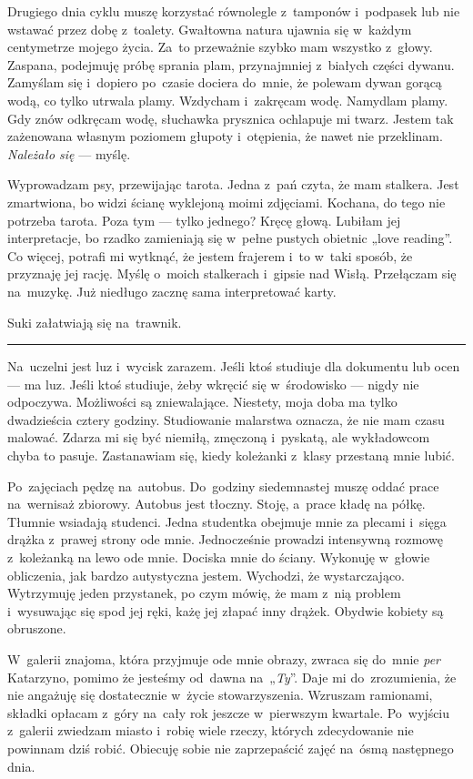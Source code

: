 \documentclass[9pt, a5paper]{memoir}
\begin{document}
Drugiego dnia cyklu muszę korzystać równolegle z~tamponów i~podpasek lub nie wstawać przez dobę z~toalety. Gwałtowna natura ujawnia się w~każdym centymetrze mojego życia. Za~to przeważnie szybko mam wszystko z~głowy. Zaspana, podejmuję próbę sprania plam, przynajmniej z~białych części dywanu. Zamyślam się i~dopiero po~czasie dociera do~mnie, że polewam dywan gorącą wodą, co tylko utrwala plamy. Wzdycham i~zakręcam wodę. Namydlam plamy. Gdy znów odkręcam wodę, słuchawka prysznica ochlapuje mi twarz. Jestem tak zażenowana własnym poziomem głupoty i~otępienia, że nawet nie przeklinam. \textit{Należało się} --- myślę.

Wyprowadzam psy, przewijając tarota. Jedna z~pań czyta, że mam stalkera. Jest zmartwiona, bo widzi ścianę wyklejoną moimi zdjęciami. Kochana, do tego nie potrzeba tarota. Poza tym --- tylko jednego? Kręcę głową. Lubiłam jej interpretacje, bo rzadko zamieniają się w~pełne pustych obietnic „love reading”. Co więcej, potrafi mi wytknąć, że jestem frajerem i~to w~taki sposób, że przyznaję jej rację. Myślę o~moich stalkerach i~gipsie nad Wisłą. Przełączam się na~muzykę. Już niedługo zacznę sama interpretować karty.

Suki załatwiają się na~trawnik.

\fancybreak{* \quad * \quad *}

Na~uczelni jest luz i~wycisk zarazem. Jeśli ktoś studiuje dla dokumentu lub ocen --- ma luz. Jeśli ktoś studiuje, żeby wkręcić się w~środowisko --- nigdy nie odpoczywa. Możliwości są zniewalające. Niestety, moja doba ma tylko dwadzieścia cztery godziny. Studiowanie malarstwa oznacza, że nie mam czasu malować. Zdarza mi się być niemiłą, zmęczoną i~pyskatą, ale wykładowcom chyba to pasuje. Zastanawiam się, kiedy koleżanki z~klasy przestaną mnie lubić.

Po~zajęciach pędzę na~autobus. Do~godziny siedemnastej muszę oddać prace na~wernisaż zbiorowy. Autobus jest tłoczny. Stoję, a~prace kładę na półkę. Tłumnie wsiadają studenci. Jedna studentka obejmuje mnie za plecami i~sięga drążka z~prawej strony ode mnie. Jednocześnie prowadzi intensywną rozmowę z~koleżanką na lewo ode mnie. Dociska mnie do ściany. Wykonuję w~głowie obliczenia, jak bardzo autystyczna jestem. Wychodzi, że wystarczająco. Wytrzymuję jeden przystanek, po czym mówię, że mam z~nią problem i~wysuwając się spod jej ręki, każę jej złapać inny drążek. Obydwie kobiety są obruszone.

W~galerii znajoma, która przyjmuje ode mnie obrazy, zwraca się do~mnie \textit{per} Katarzyno, pomimo że jesteśmy od~dawna na~„\textit{Ty}”. Daje mi do~zrozumienia, że nie angażuję się dostatecznie w~życie stowarzyszenia. Wzruszam ramionami, składki opłacam z~góry na~cały rok jeszcze w~pierwszym kwartale. Po~wyjściu z~galerii zwiedzam miasto i~robię wiele rzeczy, których zdecydowanie nie powinnam dziś robić. Obiecuję sobie nie zaprzepaścić zajęć na~ósmą następnego dnia.
\end{document}
